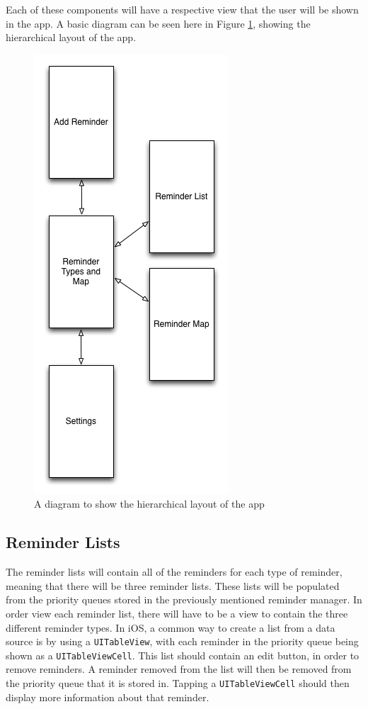 \documentclass[12pt]{report}
\begin{document}
Each of these components will have a respective view that the user will be shown in the app. A basic diagram can be seen here in Figure \ref{fig:apphierarchy}, showing the hierarchical layout of the app.

\begin{figure}[H]
\centering
\includegraphics[scale=0.5]{images/app-hierarchy}
\caption{A diagram to show the hierarchical layout of the app}
\label{fig:apphierarchy}
\end{figure}

\subsection{Reminder Lists}

The reminder lists will contain all of the reminders for each type of reminder, meaning that there will be three reminder lists. These lists will be populated from the priority queues stored in the previously mentioned reminder manager. In order view each reminder list, there will have to be a view to contain the three different reminder types. In iOS, a common way to create a list from a data source is by using a \texttt{UITableView}, with each reminder in the priority queue being shown as a \texttt{UITableViewCell}. This list should contain an edit button, in order to remove reminders. A reminder removed from the list will then be removed from the priority queue that it is stored in. Tapping a \texttt{UITableViewCell} should then display more information about that reminder.
\end{document}
